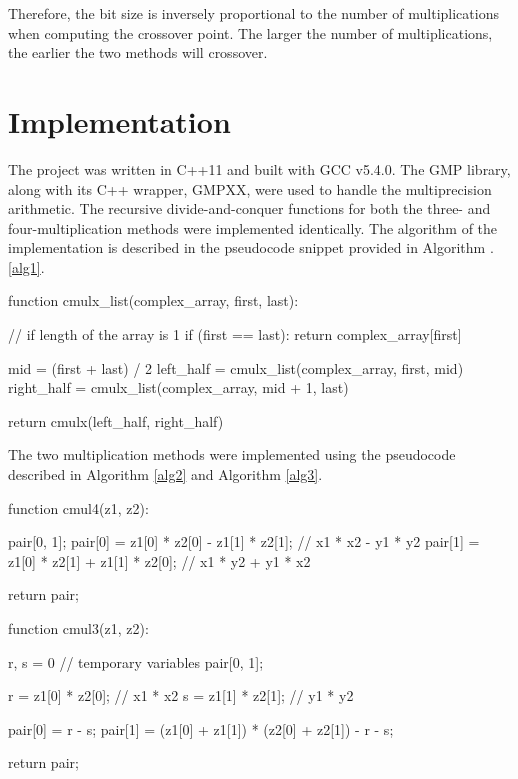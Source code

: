 \documentclass[usletter, 12pt]{article}
\begin{document}
        Therefore, the bit size is inversely proportional to the number of multiplications when computing the crossover point. The larger the number of multiplications, the earlier the two methods will crossover.

    \section{Implementation}
    The project was written in C++11 and built with GCC v5.4.0. The GMP library, along with its C++ wrapper, GMPXX, were used to handle the multiprecision arithmetic. The recursive divide-and-conquer functions for both the three- and four-multiplication methods were implemented identically. The algorithm of the implementation is described in the pseudocode snippet provided in Algorithm \thesection.\ref{alg1}.

\begin{pseudocode}[caption={Divide and Conquer Multiplication}, label={alg1}]
function cmulx_list(complex_array, first, last):

    // if length of the array is 1
    if (first == last):
        return complex_array[first]

    mid = (first + last) / 2
    left_half = cmulx_list(complex_array, first, mid)
    right_half = cmulx_list(complex_array, mid + 1, last)

    return cmulx(left_half, right_half)

\end{pseudocode}

    The two multiplication methods were implemented using the pseudocode described in Algorithm \ref{alg2} and Algorithm \ref{alg3}.

\begin{pseudocode}[caption={Four Multiplication}, label={alg2}]
function cmul4(z1, z2):

    pair[0, 1];
    pair[0] = z1[0] * z2[0] - z1[1] * z2[1];  // x1 * x2 - y1 * y2
    pair[1] = z1[0] * z2[1] + z1[1] * z2[0];  // x1 * y2 + y1 * x2

    return pair;

\end{pseudocode}

\begin{pseudocode}[caption={Three Multiplication}, label={alg3}]
function cmul3(z1, z2):

    r, s = 0  // temporary variables
    pair[0, 1];

    r = z1[0] * z2[0];  // x1 * x2
    s = z1[1] * z2[1];  // y1 * y2

    pair[0] = r - s;
    pair[1] = (z1[0] + z1[1]) * (z2[0] + z2[1]) - r - s;

    return pair;

\end{pseudocode}
\end{document}
